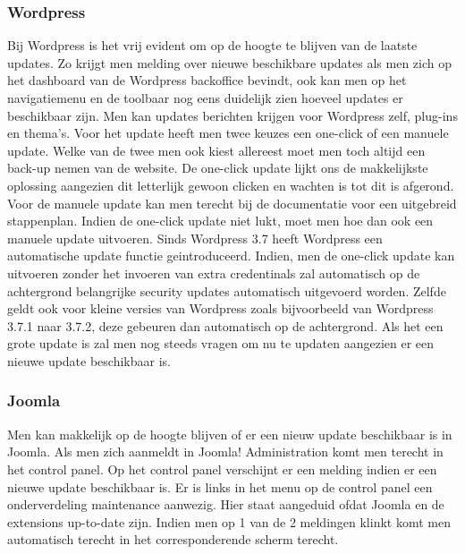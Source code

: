 \subsubsection{Wordpress}
Bij Wordpress is het vrij evident om op de hoogte te blijven van de laatste updates. Zo krijgt men melding over nieuwe beschikbare updates als men zich op het dashboard van de Wordpress backoffice bevindt, ook kan men op het navigatiemenu en de toolbaar nog eens duidelijk zien hoeveel updates er beschikbaar zijn. Men kan updates berichten krijgen voor Wordpress zelf, plug-ins en thema's. Voor het update heeft men twee keuzes een one-click of een manuele update. Welke van de twee men ook kiest allereest moet men toch altijd een back-up nemen van de website. De one-click update lijkt ons de makkelijkste oplossing aangezien dit letterlijk gewoon clicken en wachten is tot dit is afgerond. Voor de manuele update kan men terecht bij de documentatie voor een uitgebreid stappenplan. Indien de one-click update niet lukt, moet men hoe dan ook een manuele update uitvoeren. Sinds Wordpress 3.7 heeft Wordpress een automatische update functie geintroduceerd. Indien, men de one-click update kan uitvoeren zonder het invoeren van extra credentinals zal automatisch op de achtergrond belangrijke security updates automatisch uitgevoerd worden. Zelfde geldt ook voor kleine versies van Wordpress zoals bijvoorbeeld van Wordpress 3.7.1 naar 3.7.2, deze gebeuren dan automatisch op de achtergrond. Als het een grote update is zal men nog steeds vragen om nu te updaten aangezien er een nieuwe update beschikbaar is.
\subsubsection{Joomla}
Men kan makkelijk op de hoogte blijven of er een nieuw update beschikbaar is in Joomla. Als men zich aanmeldt in Joomla! Administration komt men terecht in het control panel. Op het control panel verschijnt er een melding indien er een nieuwe update beschikbaar is. Er is links in het menu op de control panel een onderverdeling maintenance aanwezig. Hier staat aangeduid ofdat Joomla en de extensions up-to-date zijn. Indien men op 1 van de 2 meldingen klinkt komt men automatisch terecht in het corresponderende scherm terecht.

